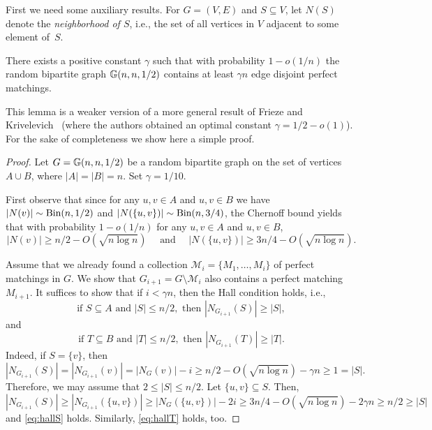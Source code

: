 \documentclass[12pt,reqno]{amsart}
\begin{document}
First we need some auxiliary results. For $G=(V,E)$ and $S\subseteq V$, let $N(S)$ denote the \emph{neighborhood of $S$}, i.e., the set of all vertices in $V$ adjacent to some element of~$S$.

\begin{lemma}\label{lem:bipartite}
There exists a positive constant $\gamma$ such that with probability $1-o(1/n)$ the random bipartite graph $\mathbb{G}(n,n,1/2)$ contains at least $\gamma n$ edge disjoint perfect matchings.
\end{lemma}
This lemma is a weaker version of a more general result of Frieze and Krivelevich~\cite{FK} (where the authors obtained an optimal constant $\gamma=1/2-o(1)$). For the sake of completeness we show here a simple proof.


\begin{proof}
Let $G=\mathbb{G}(n,n,1/2)$ be a random bipartite graph on the set of vertices $A\cup B$, where $|A| = |B| = n$. Set $\gamma=1/10$. 

First observe that since for any $u,v \in A$ and $u,v \in B$ we have $|N(v)|\sim \textrm{Bin}(n,1/2)$ and $|N(\{u,v\})|\sim\textrm{Bin}(n,3/4)$, the Chernoff bound yields that with probability $1-o(1/n)$ for any $u,v \in A$ and $u,v \in B$,
\[
|N(v)| \ge n/2 - O(\sqrt{n\log n}) \quad \text{ and }\quad |N(\{u,v\})| \ge 3n/4 - O(\sqrt{n\log n}).
\]

Assume that we already found a collection $\mathcal{M}_i = \{M_1,\dots,M_{i}\}$ of perfect matchings in $G$. We show that $G_{i+1} = G\setminus \mathcal{M}_i$ also contains a perfect matching $M_{i+1}$. It suffices to show that if $i<\gamma n$, then the Hall condition holds, i.e., 
\begin{equation}\label{eq:hallS}
\text{if } S\subseteq A \text{ and } |S| \le n/2, \text{ then } |N_{G_{i+1}}(S)| \ge |S|,
\end{equation}
and
\begin{equation}\label{eq:hallT}
\text{if } T\subseteq B \text{ and } |T| \le n/2, \text{ then } |N_{G_{i+1}}(T)| \ge |T|.
\end{equation}
Indeed, if $S=\{v\}$, then 
\[
|N_{G_{i+1}}(S)| = |N_{G_{i+1}}(v)| = |N_G(v)| - i \ge n/2 - O(\sqrt{n\log n}) - \gamma n \ge 1 = |S|.
\] 
Therefore, we may assume that $2 \le |S| \le n/2$. Let $\{u,v\} \subseteq S$. Then, 
\[
|N_{G_{i+1}}(S)| \ge |N_{G_{i+1}}(\{u,v\})| \ge |N_{G}(\{u,v\})| -2i
\ge 3n/4 - O(\sqrt{n\log n}) -2\gamma n \ge n/2 \ge |S|
\]
and \eqref{eq:hallS} holds. Similarly, \eqref{eq:hallT} holds, too.
\end{proof}
\end{document}
